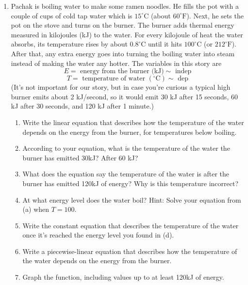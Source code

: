 \begin{enumerate}
\item Pachak is boiling water to make some ramen noodles. He fills the pot with a couple of cups of cold tap water which is $15^\circ\text{C}$ (about $60^\circ\text{F}$). Next, he sets the pot on the stove and turns on the burner.  The burner adds thermal energy measured in kilojoules (kJ) to the water. For every kilojoule of heat the water absorbs, its temperature rises by about $0.8^\circ\text{C}$ until it hits $100^\circ\text{C}$ (or $212^\circ\text{F}$). After that, any extra energy goes into turning the boiling water into steam instead of making the water any hotter.
The variables in this story are 
$$E = \text{ energy from the burner (kJ)} \sim \text{ indep} $$
$$T = \text{ temperature of water } (^\circ \text{C}) \sim \text{ dep} $$
(It's not important for our story, but in case you're curious a typical high burner emits about 2 kJ/second, so it would emit 30 kJ after 15 seconds, 60 kJ after 30 seconds, and 120 kJ after 1 minute.)
\begin{enumerate}
    \item Write the linear equation that describes how the temperature of the water depends on the energy from the burner, for temperatures below boiling.
    \item According to your equation, what is the temperature of the water the burner has emitted 30kJ?  After 60 kJ?
    \item What does the equation say the temperature of the water is after the burner has emitted 120kJ of energy?  Why is this temperature incorrect?
    \item At what energy level does the water boil?  Hint: Solve your equation from (a) when $T=100$.
    \item Write the constant equation that describes the temperature of the water once it's reached the energy level you found in (d).
    \item Write a piecewise-linear equation that describes how the temperature of the water depends on the energy from the burner.
    \item Graph the function, including values up to at least 120kJ of energy.
\end{enumerate}





\end{enumerate}

\bigskip

